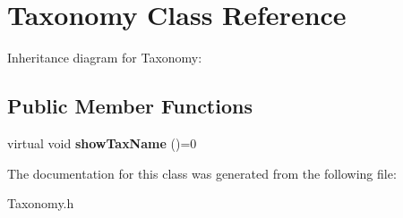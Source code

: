 \hypertarget{classTaxonomy}{}\section{Taxonomy Class Reference}
\label{classTaxonomy}


Inheritance diagram for Taxonomy\+:
\subsection*{Public Member Functions}
\begin{DoxyCompactItemize}
\item 
virtual void {\bfseries show\+Tax\+Name} ()=0\hypertarget{classTaxonomy_aedc7597a50cc7fd4d6bdcbe370e8a414}{}\label{classTaxonomy_aedc7597a50cc7fd4d6bdcbe370e8a414}

\end{DoxyCompactItemize}


The documentation for this class was generated from the following file\+:\begin{DoxyCompactItemize}
\item 
Taxonomy.\+h\end{DoxyCompactItemize}

